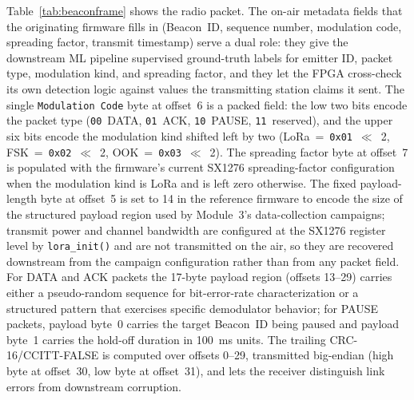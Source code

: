 \documentclass[conference]{IEEEtran}
\begin{document}
Table~\ref{tab:beaconframe} shows the radio packet. The on-air metadata fields that the originating firmware fills in (Beacon~ID, sequence number, modulation code, spreading factor, transmit timestamp) serve a dual role: they give the downstream ML pipeline supervised ground-truth labels for emitter ID, packet type, modulation kind, and spreading factor, and they let the FPGA cross-check its own detection logic against values the transmitting station claims it sent. The single \texttt{Modulation Code} byte at offset~6 is a packed field: the low two bits encode the packet type (\texttt{00}~DATA, \texttt{01}~ACK, \texttt{10}~PAUSE, \texttt{11}~reserved), and the upper six bits encode the modulation kind shifted left by two (LoRa~=~\texttt{0x01}~$\ll$~2, FSK~=~\texttt{0x02}~$\ll$~2, OOK~=~\texttt{0x03}~$\ll$~2). The spreading factor byte at offset~7 is populated with the firmware's current SX1276 spreading-factor configuration when the modulation kind is LoRa and is left zero otherwise. The fixed payload-length byte at offset~5 is set to 14 in the reference firmware to encode the size of the structured payload region used by Module~3's data-collection campaigns; transmit power and channel bandwidth are configured at the SX1276 register level by \texttt{lora\_init()} and are not transmitted on the air, so they are recovered downstream from the campaign configuration rather than from any packet field. For DATA and ACK packets the 17-byte payload region (offsets 13--29) carries either a pseudo-random sequence for bit-error-rate characterization or a structured pattern that exercises specific demodulator behavior; for PAUSE packets, payload byte~0 carries the target Beacon~ID being paused and payload byte~1 carries the hold-off duration in 100~ms units. The trailing CRC-16/CCITT-FALSE is computed over offsets 0--29, transmitted big-endian (high byte at offset~30, low byte at offset~31), and lets the receiver distinguish link errors from downstream corruption.
\end{document}
